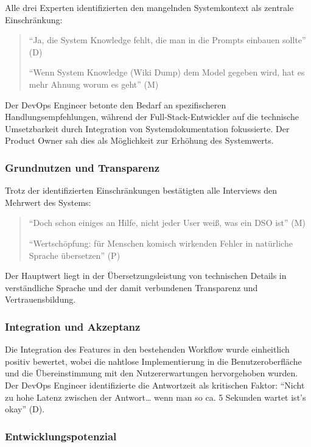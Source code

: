 \documentclass[
  a4paper,
  12pt,
  oneside,
  open=any,
  BCOR=12mm,
  DIV=14,
  parskip=half*,
  headsepline,
  footsepline,
  pointlessnumbers,
  liststotoc,
  numbers=noenddot,
  listof=totoc]{scrartcl}
\begin{document}
Alle drei Experten identifizierten den mangelnden Systemkontext als
zentrale Einschränkung:

\begin{quote}
``Ja, die System Knowledge fehlt, die man in die Prompts einbauen
sollte'' (D)

``Wenn System Knowledge (Wiki Dump) dem Model gegeben wird, hat es mehr
Ahnung worum es geht'' (M)
\end{quote}

Der DevOps Engineer betonte den Bedarf an spezifischeren
Handlungsempfehlungen, während der Full-Stack-Entwickler auf die
technische Umsetzbarkeit durch Integration von Systemdokumentation
fokussierte. Der Product Owner sah dies als Möglichkeit zur Erhöhung des
Systemwerts.

\subsubsection{Grundnutzen und
Transparenz}\label{grundnutzen-und-transparenz}

Trotz der identifizierten Einschränkungen bestätigten alle Interviews
den Mehrwert des Systems:

\begin{quote}
``Doch schon einiges an Hilfe, nicht jeder User weiß, was ein DSO ist''
(M)

``Wertschöpfung: für Menschen komisch wirkenden Fehler in natürliche
Sprache übersetzen'' (P)
\end{quote}

Der Hauptwert liegt in der Übersetzungsleistung von technischen Details
in verständliche Sprache und der damit verbundenen Transparenz und
Vertrauensbildung.

\subsubsection{Integration und
Akzeptanz}\label{integration-und-akzeptanz}

Die Integration des Features in den bestehenden Workflow wurde
einheitlich positiv bewertet, wobei die nahtlose Implementierung in die
Benutzeroberfläche und die Übereinstimmung mit den Nutzererwartungen
hervorgehoben wurden. Der DevOps Engineer identifizierte die Antwortzeit
als kritischen Faktor: ``Nicht zu hohe Latenz zwischen der
Antwort\ldots{} wenn man so ca. 5 Sekunden wartet ist's okay'' (D).

\subsubsection{Entwicklungspotenzial}\label{entwicklungspotenzial}
\end{document}
